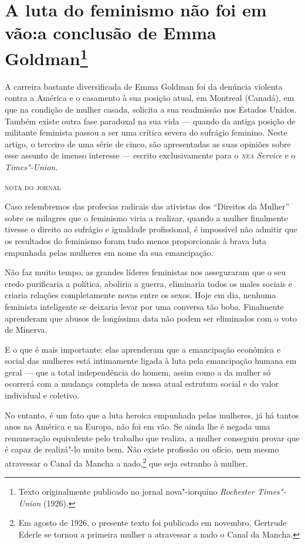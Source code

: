 \chapter[A luta do feminismo não foi em vão]{A luta do feminismo não foi em vão:\break a conclusão de Emma Goldman\footnote[*]{Texto originalmente publicado no
  jornal nova"-iorquino \emph{Rochester Times"-Union} (1926).}}

\epigraph{A carreira bastante diversificada de Emma Goldman foi da
denúncia violenta contra a América e o casamento à sua posição atual, em
Montreal (Canadá), em que na condição de mulher casada, solicita a sua readmissão nos Estados Unidos. Também existe outra fase paradoxal na sua
vida --- quando da antiga posição de militante feminista passou a ser
uma crítica severa do sufrágio feminino. Neste artigo, o terceiro de uma
série de cinco, são apresentadas as suas opiniões sobre esse assunto de
imenso interesse --- escrito exclusivamente para o \emph{\textsc{nea} Service} e o
\emph{Times"-Union.}}{\textsc{nota do jornal}}


Caso relembremos das profecias radicais das ativistas dos ``Direitos da
Mulher'' sobre os milagres que o feminismo viria a realizar, quando a
mulher finalmente tivesse o direito ao sufrágio e igualdade
profissional, é impossível não admitir que os resultados do feminismo
foram tudo menos proporcionais à brava luta empunhada pelas mulheres em
nome da sua emancipação.

Não faz muito tempo, as grandes líderes feministas nos asseguraram
que o seu credo purificaria a política, aboliria a guerra, eliminaria
todos os males sociais e criaria relações completamente novas entre os
sexos. Hoje em dia, nenhuma feminista inteligente se deixaria levar por
uma conversa tão boba. Finalmente aprenderam que abusos de longíssima
data não podem ser eliminados com o voto de Minerva.

E o que é mais importante: elas aprenderam que a emancipação econômica e
social das mulheres está intimamente ligada à luta pela emancipação
humana em geral --- que a total independência do homem, assim como a da
mulher só ocorrerá com a mudança completa de nossa atual estrutura
social e do valor individual e coletivo.

No entanto, é um fato que a luta heroica empunhada pelas mulheres, já há
tantos anos na América e na Europa, não foi em vão. Se ainda lhe é
negada uma remuneração equivalente pelo trabalho que realiza, a mulher
conseguiu provar que é capaz de realizá"-lo muito bem. Não existe
profissão ou ofício, nem mesmo atravessar o Canal da Mancha a
nado,\footnote{Em agosto de 1926, o presente texto foi publicado em
  novembro, Gertrude Ederle se tornou a primeira mulher a atravessar a
  nado o Canal da Mancha.} que seja estranho à mulher.


